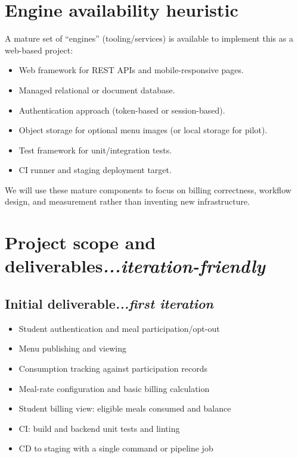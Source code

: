 \documentclass[12pt,a4paper]{article}
\newcommand{\secann}[1]{\hfill\normalfont\itshape #1}
\begin{document}
\section{Engine availability heuristic}

A mature set of ``engines'' (tooling/services) is available to implement this
as a web-based project:

\begin{itemize}
    \item Web framework for REST APIs and mobile-responsive pages.
    \item Managed relational or document database.
    \item Authentication approach (token-based or session-based).
    \item Object storage for optional menu images (or local storage for
    pilot).
    \item Test framework for unit/integration tests.
    \item CI runner and staging deployment target.
\end{itemize}

We will use these mature components to focus on billing correctness, workflow
design, and measurement rather than inventing new infrastructure.

\section{Project scope and deliverables\secann{...iteration-friendly}}

\subsection{Initial deliverable\secann{...first iteration}}

\begin{itemize}
    \item Student authentication and meal participation/opt-out
    \item Menu publishing and viewing
    \item Consumption tracking against participation records
    \item Meal-rate configuration and basic billing calculation
    \item Student billing view: eligible meals consumed and balance
    \item CI: build and backend unit tests and linting
    \item CD to staging with a single command or pipeline job
\end{itemize}
\end{document}
